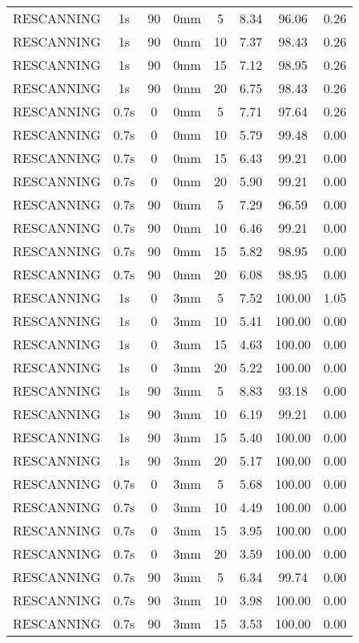 \begin{table}[H]
\begin{tabular}{|c||c|c|c|c||c|c|c|}
RESCANNING & 1s & 90 & 0mm & 5 & 8.34 & 96.06 & 0.26 \\
RESCANNING & 1s & 90 & 0mm & 10 & 7.37 & 98.43 & 0.26 \\
RESCANNING & 1s & 90 & 0mm & 15 & 7.12 & 98.95 & 0.26 \\
RESCANNING & 1s & 90 & 0mm & 20 & 6.75 & 98.43 & 0.26 \\
RESCANNING & 0.7s & 0 & 0mm & 5 & 7.71 & 97.64 & 0.26 \\
RESCANNING & 0.7s & 0 & 0mm & 10 & 5.79 & 99.48 & 0.00 \\
RESCANNING & 0.7s & 0 & 0mm & 15 & 6.43 & 99.21 & 0.00 \\
RESCANNING & 0.7s & 0 & 0mm & 20 & 5.90 & 99.21 & 0.00 \\
RESCANNING & 0.7s & 90 & 0mm & 5 & 7.29 & 96.59 & 0.00 \\
RESCANNING & 0.7s & 90 & 0mm & 10 & 6.46 & 99.21 & 0.00 \\
RESCANNING & 0.7s & 90 & 0mm & 15 & 5.82 & 98.95 & 0.00 \\
RESCANNING & 0.7s & 90 & 0mm & 20 & 6.08 & 98.95 & 0.00 \\
RESCANNING & 1s & 0 & 3mm & 5 & 7.52 & 100.00 & 1.05 \\
RESCANNING & 1s & 0 & 3mm & 10 & 5.41 & 100.00 & 0.00 \\
RESCANNING & 1s & 0 & 3mm & 15 & 4.63 & 100.00 & 0.00 \\
RESCANNING & 1s & 0 & 3mm & 20 & 5.22 & 100.00 & 0.00 \\
RESCANNING & 1s & 90 & 3mm & 5 & 8.83 & 93.18 & 0.00 \\
RESCANNING & 1s & 90 & 3mm & 10 & 6.19 & 99.21 & 0.00 \\
RESCANNING & 1s & 90 & 3mm & 15 & 5.40 & 100.00 & 0.00 \\
RESCANNING & 1s & 90 & 3mm & 20 & 5.17 & 100.00 & 0.00 \\
RESCANNING & 0.7s & 0 & 3mm & 5 & 5.68 & 100.00 & 0.00 \\
RESCANNING & 0.7s & 0 & 3mm & 10 & 4.49 & 100.00 & 0.00 \\
RESCANNING & 0.7s & 0 & 3mm & 15 & 3.95 & 100.00 & 0.00 \\
RESCANNING & 0.7s & 0 & 3mm & 20 & 3.59 & 100.00 & 0.00 \\
RESCANNING & 0.7s & 90 & 3mm & 5 & 6.34 & 99.74 & 0.00 \\
RESCANNING & 0.7s & 90 & 3mm & 10 & 3.98 & 100.00 & 0.00 \\
RESCANNING & 0.7s & 90 & 3mm & 15 & 3.53 & 100.00 & 0.00 \\

\end{tabular}
\end{table}
